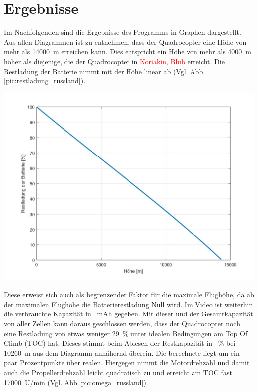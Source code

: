 \section{Ergebnisse}
\label{sec:ergebnisse_quadrocopter}
Im Nachfolgenden sind die Ergebnisse des Programms in Graphen dargestellt. Aus allen Diagrammen ist zu entnehmen, dass der Quadrocopter eine Höhe von mehr als \SI{14000}{m} erreichen kann. Dies entspricht ein Höhe von mehr als \SI{4000}{m} höher als diejenige, die der Quadrocopter in \textcolor{red}{Koriakin, Blub} erreicht.
Die Restladung der Batterie nimmt mit der Höhe linear ab (Vgl. Abb.\ref{pic:restladung_russland}).  
\begin{center}
	\includegraphics[scale=0.3]{Diagramme/C_Rest_V.jpg}
	\label{pic:restladung_russland}
\end{center}
Diese erweist sich auch als begrenzender Faktor für die maximale Flughöhe, da ab der maximalen Flughöhe die Batterierestladung Null wird. Im Video ist weiterhin die verbrauchte Kapazität in \SI{}{mAh} gegeben. Mit dieser und der Gesamtkapazität von aller Zellen kann daraus geschlossen werden, dass der Quadrocopter noch eine Restladung von etwas weniger \SI{29}{\%} unter idealen Bedingungen am Top Of Climb (TOC) hat. Dieses stimmt beim Ablesen der Restkapazität in \SI{}{\%} bei \SI{10260}{m} aus dem Diagramm annähernd überein. Die berechnete liegt um ein paar Prozentpunkte über realen.
Hiergegen nimmt die Motordrehzahl und damit auch die Propellerdrehzahl leicht quadratisch zu und erreicht am TOC fast \SI{17000}{U/min} (Vgl. Abb.\ref{pic:omega_russland}).  
